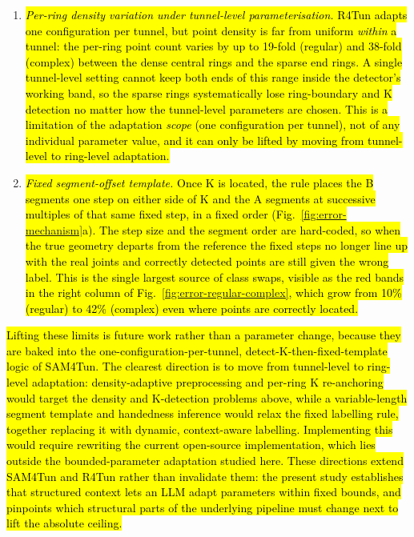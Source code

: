 \documentclass[a4paper,fleqn]{cas-dc}
\begin{document}
{\begin{enumerate}
\item \hl{\emph{Per-ring density variation under tunnel-level parameterisation.} R4Tun adapts one configuration per tunnel, but point density is far from uniform \emph{within} a tunnel: the per-ring point count varies by up to 19-fold (regular) and 38-fold (complex) between the dense central rings and the sparse end rings. A single tunnel-level setting cannot keep both ends of this range inside the detector's working band, so the sparse rings systematically lose ring-boundary and K detection no matter how the tunnel-level parameters are chosen. This is a limitation of the adaptation \emph{scope} (one configuration per tunnel), not of any individual parameter value, and it can only be lifted by moving from tunnel-level to ring-level adaptation.}
\item \hl{\emph{Fixed segment-offset template.} Once K is located, the rule places the B segments one step on either side of K and the A segments at successive multiples of that same fixed step, in a fixed order (Fig.~\ref{fig:error-mechanism}a). The step size and the segment order are hard-coded, so when the true geometry departs from the reference the fixed steps no longer line up with the real joints and correctly detected points are still given the wrong label. This is the single largest source of class swaps, visible as the red bands in the right column of Fig.~\ref{fig:error-regular-complex}, which grow from 10\% (regular) to 42\% (complex) even where points are correctly located.}
\end{enumerate}

\hl{Lifting these limits is future work rather than a parameter change, because they are baked into the one-configuration-per-tunnel, detect-K-then-fixed-template logic of SAM4Tun. The clearest direction is to move from tunnel-level to ring-level adaptation: density-adaptive preprocessing and per-ring K re-anchoring would target the density and K-detection problems above, while a variable-length segment template and handedness inference would relax the fixed labelling rule, together replacing it with dynamic, context-aware labelling. Implementing this would require rewriting the current open-source implementation, which lies outside the bounded-parameter adaptation studied here. These directions extend SAM4Tun and R4Tun rather than invalidate them: the present study establishes that structured context lets an LLM adapt parameters within fixed bounds, and pinpoints which structural parts of the underlying pipeline must change next to lift the absolute ceiling.}


}
\end{document}
